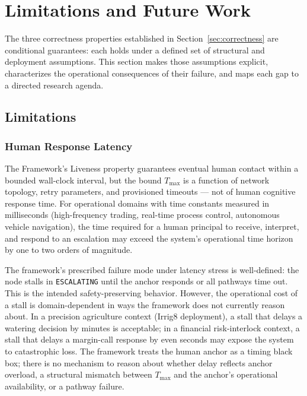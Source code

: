 \section{Limitations and Future Work}\label{sec:limitations}

The three correctness properties established in Section~\ref{sec:correctness}
are conditional guarantees: each holds under a defined set of structural and
deployment assumptions.  This section makes those assumptions explicit,
characterizes the operational consequences of their failure, and maps each
gap to a directed research agenda.

\subsection{Limitations}\label{sec:limitations:subsection}

\subsubsection{Human Response Latency}\label{sec:human-response-latency}

The \bxthree{} Framework's Liveness property guarantees eventual human contact
within a bounded wall-clock interval, but the bound $T_{\max}$ is a function of
network topology, retry parameters, and provisioned timeouts --- not of human
cognitive response time.  For operational domains with time constants measured
in milliseconds (high-frequency trading, real-time process control, autonomous
vehicle navigation), the time required for a human principal to receive,
interpret, and respond to an escalation may exceed the system's operational
time horizon by one to two orders of magnitude.

The framework's prescribed failure mode under latency stress is well-defined:
the node stalls in \texttt{ESCALATING} until the anchor responds or all
pathways time out.  This is the intended safety-preserving behavior.  However,
the operational cost of a stall is domain-dependent in ways the framework
does not currently reason about.  In a precision agriculture context (Irrig8
deployment), a stall that delays a watering decision by minutes is acceptable;
in a financial risk-interlock context, a stall that delays a margin-call
response by even seconds may expose the system to catastrophic loss.  The
framework treats the human anchor as a timing black box; there is no mechanism
to reason about whether delay reflects anchor overload, a structural mismatch
between $T_{\max}$ and the anchor's operational availability, or a pathway
failure.


